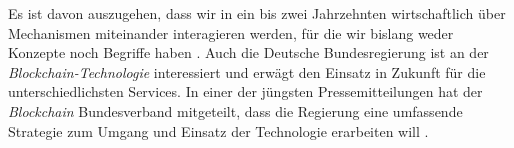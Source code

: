 \glqq Es ist davon auszugehen, dass wir in ein bis zwei Jahrzehnten wirtschaftlich über Mechanismen miteinander interagieren werden, für die wir bislang weder Konzepte noch Begriffe haben\grqq{} \citep[S.~92]{Platzer2014}.
Auch die Deutsche Bundesregierung ist an der \textit{Blockchain-Technologie} interessiert und erwägt den Einsatz in Zukunft für die unterschiedlichsten Services. In einer der jüngsten Pressemitteilungen hat der \textit{Blockchain} Bundesverband mitgeteilt, dass die Regierung eine umfassende Strategie zum Umgang und Einsatz der Technologie erarbeiten will \citep{BCBundesverband2018}.

\newpage
